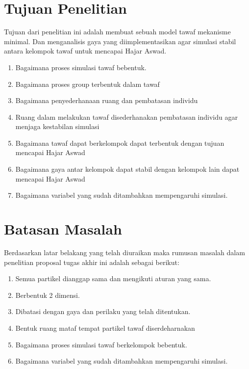 \section{Tujuan Penelitian}\label{sec:tujuan}
\hspace{0.6cm}Tujuan dari penelitian ini adalah membuat sebuah model tawaf mekanisme minimal. Dan menganalisis gaya yang diimplementasikan agar simulasi stabil antara kelompok tawaf untuk mencapai Hajar Aswad.

\begin{enumerate}
\item{Bagaimana proses simulasi tawaf bebentuk.}
\item{Bagaimana proses group terbentuk dalam tawaf}
\item{Bagaimana penyederhanaan ruang dan pembatasan individu}
\item{Ruang dalam melakukan tawaf disederhanakan pembatasan individu agar menjaga kestabilan simulasi}
\item{Bagaimana tawaf dapat berkelompok dapat terbentuk dengan tujuan mencapai Hajar Aswad}
\item{Bagaimana gaya antar kelompok dapat stabil dengan kelompok lain dapat mencapai Hajar Aswad}
\item{Bagaimana variabel yang sudah ditambahkan mempengaruhi simulasi.}
\end{enumerate}

\section{Batasan Masalah}\label{sec:batasan}
Berdasarkan latar belakang yang telah diuraikan maka rumusan masalah dalam penelitian proposal tugas akhir ini adalah sebagai berikut:
\begin{enumerate} 
\item{Semua partikel dianggap sama dan mengikuti aturan yang sama.} 
\item{Berbentuk 2 dimensi.} 
\item{Dibatasi dengan gaya dan perilaku yang telah ditentukan.} 
\item{Bentuk ruang mataf tempat partikel tawaf diserdeharnakan}
\item{Bagaimana proses simulasi tawaf berkelompok  bebentuk.} 
\item{Bagaimana variabel yang sudah ditambahkan mempengaruhi simulasi.}
\end{enumerate}


